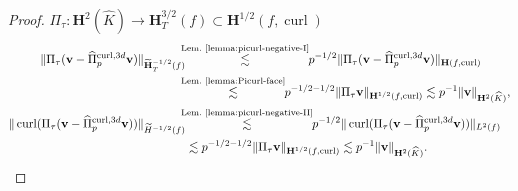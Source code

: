 \documentclass{article}
\newcommand{\hatPicurlcom}{\widehat \Pi^{\operatorname*{curl},3d}_p}
\begin{document}
\begin{proof}
$\Pi_\tau: {\mathbf H}^2(\widehat K) \rightarrow {\mathbf H}^{3/2}_T(f) \subset {\mathbf H}^{1/2}(f,\operatorname{curl})$ 
\begin{align*}
\Vert\Pi_{\tau}({\mathbf{v}}-\hatPicurlcom{\mathbf{v})%
}\Vert_{\widetilde{\mathbf{H}}_T^{-1/2}(f)}  &\!\!\!\! 
 \stackrel{\text{Lem.~\ref{lemma:picurl-negative-I}}}{\lesssim} \!\!p^{-1/2}\Vert\Pi_{\tau
}({\mathbf{v}}-\hatPicurlcom{\mathbf{v}})\Vert
_{{\mathbf{H}}(f,\operatorname{curl})}\\
& \!\!\!\! \stackrel{\text{Lem.~\ref{lemma:Picurl-face}}}{\lesssim} 
\!\!
p^{-1/2-1/2}\Vert\Pi_{\tau}{\mathbf{v}}\Vert_{{\mathbf{H}}%
^{1/2}(f,\operatorname{curl})}%
\lesssim p^{-1}\Vert{\mathbf{v}}\Vert
_{{\mathbf{H}}^{2}(\widehat{K})},\\
\Vert\operatorname{curl}(\Pi_{\tau}({\mathbf{v}}-\hatPicurlcom%
{\mathbf{v}}))\Vert_{\widetilde{H}^{-1/2}(f)}  &  
\!\!\!\!
\stackrel{\text{Lem.~\ref{lemma:picurl-negative-II}}}{\lesssim}
\!\!
p^{-1/2}\Vert\operatorname{curl}(\Pi_{\tau}({\mathbf{v}}%
-\hatPicurlcom{\mathbf{v}}))\Vert_{L^{2}(f)}\\
&  \lesssim p^{-1/2-1/2} \Vert\Pi_{\tau}{\mathbf{v}}\Vert_{{\mathbf{H}}%
^{1/2}(f,\operatorname{curl})} %
\lesssim p^{-1}\Vert{\mathbf{v}}\Vert
_{{\mathbf{H}}^{2}(\widehat{K})}.
\end{align*}


\end{proof}
\end{document}
